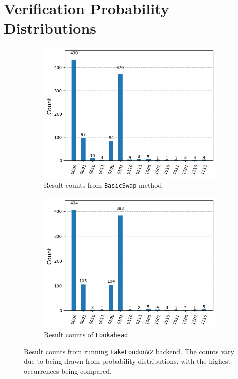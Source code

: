 \chapter{Verification Probability Distributions} \label{app:verification-probability}
\begin{figure}[htb]
    \centering
    \begin{subfigure}{0.45\linewidth}
        \includegraphics[width=\linewidth]{image/plot_basic.png}
        \caption{Result counts from \lstinline{BasicSwap} method}
        \label{fig:plot-basic}
    \end{subfigure}
    \begin{subfigure}{0.45\linewidth}
        \includegraphics[width=\linewidth]{image/plot_lookahead.png}
        \caption{Result counts of \lstinline{Lookahead}}
        \label{fig:plot-lookahead}
        \end{subfigure}
    \caption{Result counts from running \lstinline{FakeLondonV2} backend. The counts vary due to being drawn from probability distributions, with the highest occurrences being compared.}
\end{figure}